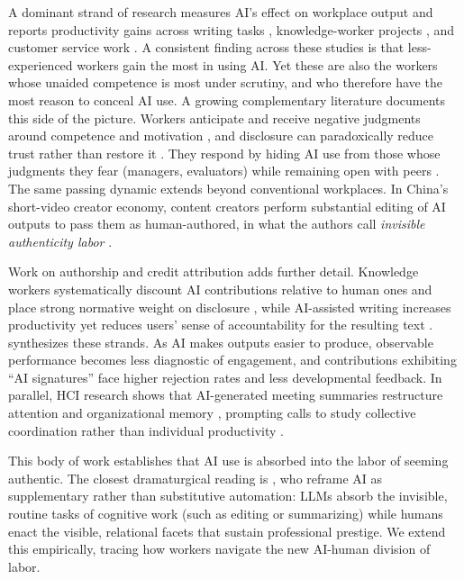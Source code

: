 \documentclass[pdflatex,sn-basic]{sn-jnl}%
\theoremstyle{thmstyleone}%
\theoremstyle{thmstyletwo}%
\theoremstyle{thmstylethree}%
\begin{document}
A dominant strand of research measures AI's effect on workplace output and reports productivity gains across writing tasks \citep{noy2023experimental}, knowledge-worker projects \citep{dellacqua2023navigating}, and customer service work \citep{brynjolfsson2025generative}. A consistent finding across these studies is that less-experienced workers gain the most in using AI. Yet these are also the workers whose unaided competence is most under scrutiny, and who therefore have the most reason to conceal AI use. A growing complementary literature documents this side of the picture. Workers anticipate and receive negative judgments around competence and motivation \citep{reif2025social}, and disclosure can paradoxically reduce trust rather than restore it \citep{schilke2025transparency}. They respond by hiding AI use from those whose judgments they fear (managers, evaluators) while remaining open with peers \citep{xia2026clever}. The same passing dynamic extends beyond conventional workplaces. In China's short-video creator economy, content creators perform substantial editing of AI outputs to pass them as human-authored, in what the authors call \textit{invisible authenticity labor} \citep{su2026passing}.

Work on authorship and credit attribution adds further detail. Knowledge workers systematically discount AI contributions relative to human ones and place strong normative weight on disclosure \citep{he2025credit}, while AI-assisted writing increases productivity yet reduces users' sense of accountability for the resulting text \citep{li2024writing}. \citet{chopra2026engagement} synthesizes these strands. As AI makes outputs easier to produce, observable performance becomes less diagnostic of engagement, and contributions exhibiting ``AI signatures'' face higher rejection rates and less developmental feedback. In parallel, HCI research shows that AI-generated meeting summaries restructure attention and organizational memory \citep{asthana2025meeting}, prompting calls to study collective coordination rather than individual productivity \citep{woolley2025collaboration}.

This body of work establishes that AI use is absorbed into the labor of seeming authentic. The closest dramaturgical reading is \citet{klowait2025presentation}, who reframe AI as supplementary rather than substitutive automation: LLMs absorb the invisible, routine tasks of cognitive work (such as editing or summarizing) while humans enact the visible, relational facets that sustain professional prestige. We extend this empirically, tracing how workers navigate the new AI-human division of labor.
\end{document}
